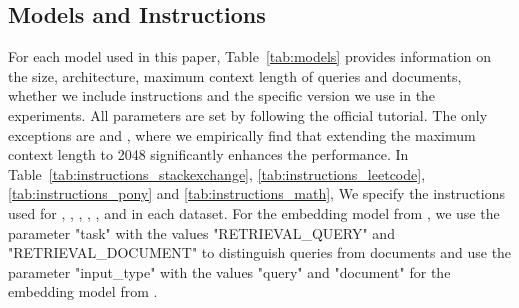 \subsection{Models and Instructions}
\label{app:modelinstructions}
For each model used in this paper, Table~\ref{tab:models} provides information on the size, architecture, maximum context length of queries and documents, whether we include instructions and the specific version we use in the experiments.
All parameters are set by following the official tutorial.
The only exceptions are \instructorL and \instructorXL, where we empirically find that extending the maximum context length to 2048 significantly enhances the performance.
In Table~\ref{tab:instructions_stackexchange}, \ref{tab:instructions_leetcode}, \ref{tab:instructions_pony} and \ref{tab:instructions_math}, We specify the instructions used for \bge, \instructorL, \instructorXL, \efive, \grit, \qwen and \sfr in each dataset.
For the embedding model from \google, we use the parameter "task" with the values "RETRIEVAL\_QUERY" and "RETRIEVAL\_DOCUMENT" to distinguish queries from documents and use the parameter "input\_type" with the values "query" and "document" for the embedding model from \voyage.







